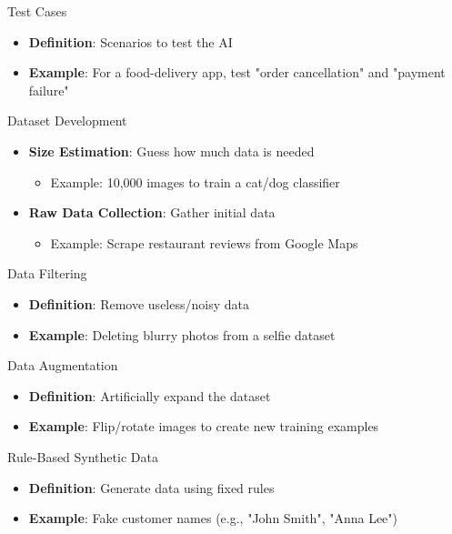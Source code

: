 \documentclass{beamer}
\begin{document}
\begin{frame}{Test Cases}
\begin{itemize}
\item \textbf{Definition}: Scenarios to test the AI
\item \textbf{Example}: For a food-delivery app, test "order cancellation" and "payment failure"
\end{itemize}
\end{frame}

\begin{frame}{Dataset Development}
\begin{itemize}
\item \textbf{Size Estimation}: Guess how much data is needed
  \begin{itemize}
  \item Example: 10,000 images to train a cat/dog classifier
  \end{itemize}
\item \textbf{Raw Data Collection}: Gather initial data
  \begin{itemize}
  \item Example: Scrape restaurant reviews from Google Maps
  \end{itemize}
\end{itemize}
\end{frame}

\begin{frame}{Data Filtering}
\begin{itemize}
\item \textbf{Definition}: Remove useless/noisy data
\item \textbf{Example}: Deleting blurry photos from a selfie dataset
\end{itemize}
\end{frame}

\begin{frame}{Data Augmentation}
\begin{itemize}
\item \textbf{Definition}: Artificially expand the dataset
\item \textbf{Example}: Flip/rotate images to create new training examples
\end{itemize}
\end{frame}

\begin{frame}{Rule-Based Synthetic Data}
\begin{itemize}
\item \textbf{Definition}: Generate data using fixed rules
\item \textbf{Example}: Fake customer names (e.g., "John Smith", "Anna Lee")
\end{itemize}
\end{frame}
\end{document}

